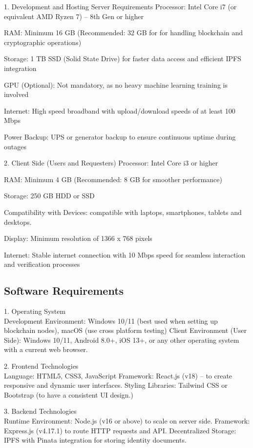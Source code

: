 1. Development and Hosting Server Requirements
Processor: Intel Core i7 (or equivalent AMD Ryzen 7) – 8th Gen or higher

RAM: Minimum 16 GB (Recommended: 32 GB for for handling blockchain and cryptographic operations)

Storage: 1 TB SSD (Solid State Drive) for faster data access and efficient IPFS integration

GPU (Optional): Not mandatory, as no heavy machine learning training is involved

Internet: High speed broadband with upload/download speeds of at least 100 Mbps

Power Backup: UPS or generator backup to ensure continuous uptime during outages

2. Client Side (Users and Requesters)
Processor: Intel Core i3 or higher

RAM: Minimum 4 GB (Recommended: 8 GB for smoother performance)

Storage: 250 GB HDD or SSD

Compatibility with Devices: compatible with laptops, smartphones, tablets and desktops.

Display: Minimum resolution of 1366 x 768 pixels

Internet: Stable internet connection with 10 Mbps speed for seamless interaction and verification processes



\subsection{Software Requirements}

1. Operating System\\
Development Environment:
Windows 10/11 (best used when setting up blockchain nodes), macOS (use cross platform testing)
Client Environment (User Side):
Windows 10/11, Android 8.0+, iOS 13+, or any other operating system with a current web browser.

2. Frontend Technologies\\
Language: HTML5, CSS3, JavaScript
Framework: React.js (v18) – to create responsive and dynamic user interfaces.
Styling Libraries: Tailwind CSS or Bootstrap (to have a consistent UI design.)

3. Backend Technologies\\
Runtime Environment: Node.js (v16 or above) to scale on server side.
Framework: Express.js (v4.17.1) to route HTTP requests and API.
Decentralized Storage: IPFS with Pinata integration for storing identity documents.

